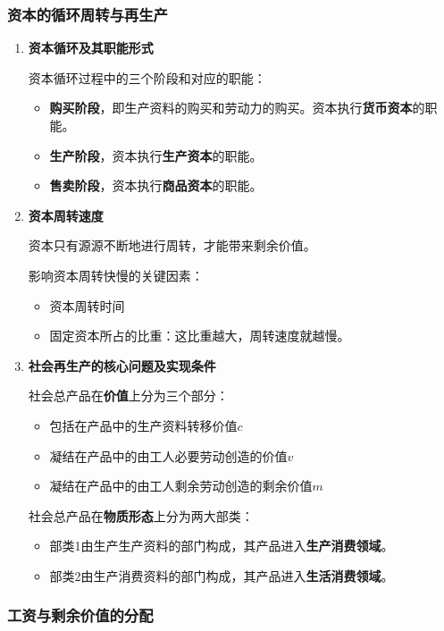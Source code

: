 \documentclass[12pt, a4paper, oneside]{ctexart}
\begin{document}
\subsubsection{资本的循环周转与再生产}

\begin{enumerate}
  \item {\bf 资本循环及其职能形式}
  
  资本循环过程中的三个阶段和对应的职能：
  \begin{itemize}
    \item {\bf 购买阶段}，即生产资料的购买和劳动力的购买。资本执行\textbf{货币资本}的职能。
    \item {\bf 生产阶段}，资本执行\textbf{生产资本}的职能。
    \item {\bf 售卖阶段}，资本执行\textbf{商品资本}的职能。
  \end{itemize}

  \item {\bf 资本周转速度}
  
  资本只有源源不断地进行周转，才能带来剩余价值。

  影响资本周转快慢的关键因素：
  \begin{itemize}
    \item 资本周转时间
    \item 固定资本所占的比重：这比重越大，周转速度就越慢。
  \end{itemize}

  \item {\bf 社会再生产的核心问题及实现条件}
  
  社会总产品在\textbf{价值}上分为三个部分：
  \begin{itemize}
    \item 包括在产品中的生产资料转移价值$c$
    \item 凝结在产品中的由工人必要劳动创造的价值$v$
    \item 凝结在产品中的由工人剩余劳动创造的剩余价值$m$
  \end{itemize}

  社会总产品在\textbf{物质形态}上分为两大部类：
  \begin{itemize}
    \item 部类1由生产生产资料的部门构成，其产品进入\textbf{生产消费领域}。
    \item 部类2由生产消费资料的部门构成，其产品进入\textbf{生活消费领域}。
  \end{itemize}
\end{enumerate}

\subsubsection{工资与剩余价值的分配}
\end{document}
